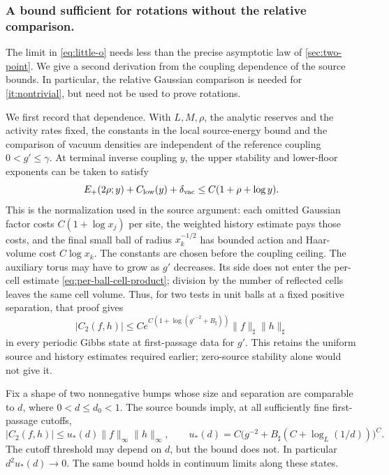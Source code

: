 \documentclass[11pt,letterpaper,reqno]{amsart}
\makeatletter
\theoremstyle{definition}
\newcommand{\ms@minorstart}{%
  \pushQED{\qed}\renewcommand{\qedsymbol}{$\blacksquare$}}
\newenvironment{lemma}[1][]{\ms@minorstart\ms@lemma[#1]}
  {\popQED\endms@lemma}
\theoremstyle{remark}
\makeatother
\begin{document}
\subsubsection*{A bound sufficient for rotations without the relative comparison.}

The limit in \eqref{eq:little-o} needs less than the precise asymptotic
law of \cref{sec:two-point}. We give a second derivation from the
coupling dependence of the source bounds. In particular, the relative
Gaussian comparison is needed for \cref{it:nontrivial}, but need not
be used to prove rotations.

We first record that dependence. With $L,M,\rho$, the analytic reserves
and the activity rates fixed, the constants in the local source-energy
bound and the comparison of vacuum densities are independent of the
reference coupling $0<g'\le\gamma$. At terminal inverse coupling $y$,
the upper stability and lower-floor exponents can be taken to satisfy
\begin{equation}\label{eq:terminal-stability-dependence}
 E_+(2\rho;y)+C_{\rm low}(y)+\delta_{\rm vac}
       \le C(1+\rho+\log y).
\end{equation}
This is the normalization used in the source argument: each omitted
Gaussian factor costs $C(1+\log x_j)$ per site, the weighted history
estimate pays those costs, and the final small ball of radius
$x_k^{-1/2}$ has bounded action and Haar-volume cost $C\log x_k$.
The constants are chosen before the coupling ceiling. The auxiliary
torus may have to grow as $g'$ decreases. Its side does not enter the
per-cell estimate \eqref{eq:per-ball-cell-product}; division by the
number of reflected cells leaves the same cell volume. Thus, for two
tests in unit balls at a fixed positive separation, that proof gives
\begin{equation}\label{eq:per-ball-coupling-dependence}
 |C_2(f,h)|\le C e^{C(1+\log(g'^{-2}+B_\sharp))}
                         \|f\|_\sharp\|h\|_\sharp
\end{equation}
in every periodic Gibbs state at first-passage data for $g'$. This
retains the uniform source and history estimates required earlier;
zero-source stability alone would not give it.

\begin{lemma}[A subpower bound at the observation scale]
\label{lem:subpower-two-point}
Fix a shape of two nonnegative bumps whose size and separation are
comparable to $d$, where $0<d\le d_0<1$. The source bounds imply, at all sufficiently fine
first-passage cutoffs,
\begin{equation}\label{eq:subpower-two-point}
 |C_2(f,h)|\le u_*(d)\|f\|_\infty\|h\|_\infty,
 \qquad
 u_*(d)=C\bigl(g^{-2}+B_\sharp(C+\log_L(1/d))\bigr)^C.
\end{equation}
The cutoff threshold may depend on $d$, but the bound does not.
In particular $d^2u_*(d)\to0$. The same bound holds in continuum
limits along these states.
\end{lemma}
\end{document}
